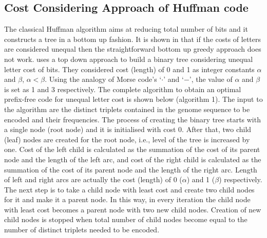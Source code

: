 \documentclass[twocolumn,12pt,a4paper]{article}
\begin{document}
\subsection{Cost Considering Approach of Huffman code}
The classical Huffman algorithm aims at reducing total number of bits and it constructs a tree in a bottom up fashion. It is shown in \citep{golin98} that if the costs of letters are considered unequal then the straightforward bottom up greedy approach does not work. \citet{Kab14} uses a top down approach to build a binary tree considering unequal letter cost of bits. They considered cost (length) of 0 and 1 as integer constants $\alpha$ and $\beta$,   $\alpha < \beta$. Using the analogy of Morse code's `$\cdot$' and `$-$', the value of $\alpha$ and $\beta$ is set as 1 and 3 respectively. The complete algorithm to obtain an optimal prefix-free code for unequal letter cost is shown below (algorithm 1). The input to the algorithm are the distinct triplets contained in the genome sequence to be encoded and their frequencies. The process of creating the binary tree starts with a single node (root node) and it is initialised with cost 0.  After that, two child (leaf) nodes are created for the root node, i.e., level of the tree is increased by one. Cost of the left child is calculated as the summation of the cost of its parent node and the length of the left arc, and cost of the right child is calculated as the summation of the cost of its parent node and the length of the right arc. Length of left and right arcs are actually the cost (length) of 0 ($\alpha$) and 1 ($\beta$) respectively. The next step is to take a child node with least cost and create two child nodes for it and make it a parent node. In this way, in every iteration the child node with least cost becomes a parent node with two new child nodes. Creation of new child nodes is stopped when total number of child nodes become equal to the number of distinct triplets needed to be encoded. 
\end{document}
